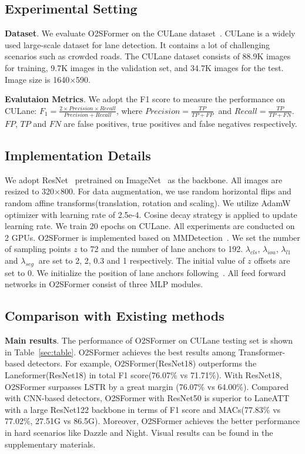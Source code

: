 \documentclass{bmvc2k}
\begin{document}
 \subsection{Experimental Setting}
 {\bf Dataset}. We evaluate O2SFormer on the CULane dataset~\cite{pan2018spatial}. CULane is a widely used large-scale dataset for lane detection. 
 It contains a lot of challenging scenarios such as crowded roads. The CULane dataset 
 consists of 88.9K images for training, 9.7K images in the validation set, and 34.7K images for the test. Image size is 1640×590. 
 
 {\bf Evalutaion Metrics}. We adopt the F1 score to measure the performance on CULane: $F_1=\frac{2\times P r e c i s i o n\times R e c a l l}{Precision+Recall}$, where $Precision=\frac{TP}{TP+FP}\ $ and $Recall=\frac{TP}{TP+FN}$. 
 $FP$, $TP$ and $FN$ are false positives, true positives and false negatives respectively.
 \vspace{-0.3cm}
 \subsection{Implementation Details}
 We adopt ResNet~\cite{he2016deep} pretrained on ImageNet~\cite{deng2009imagenet} as the backbone. 
 All images are resized to 320×800. For data augmentation, we use random horizontal 
 flips and random affine transforms(translation, rotation and scaling). We utilize 
 AdamW~\cite{loshchilov2017decoupled} optimizer with learning rate of 2.5e-4. Cosine decay strategy is applied to 
 update learning rate. We train 20 epochs on CULane. All experiments are conducted on 
 2 GPUs. O2SFormer is implemented based on MMDetection~\cite{mmdetection}. We 
 set the number of sampling points $z$ to 72 and the number of lane anchors to 192. 
 $\lambda_{cls}$, $\lambda_{iou}$, $\lambda_{l1}$ and $\lambda_{seg}\ $ are set to 2, 2, 0.3 and 1 respectively.
 The initial value of $z$ offsets are set to 0. We initialize the position of lane anchors following~\cite{zheng2022clrnet}.
 All feed forward networks in O2SFormer consist of three MLP modules.
 \vspace{-0.2cm}
 \subsection{Comparison with Existing methods}
 {\bf Main results}. The performance of O2SFormer on CULane testing set is shown in Table~\ref{sec:table}. O2SFormer 
  achieves the best results among Transformer-based detectors. For example, O2SFormer(ResNet18) 
  outperforms the Laneformer(ResNet18) in total F1 score(76.07\% vs 71.71\%). With ResNet18, O2SFormer surpasses LSTR by a great margin (76.07\% vs 64.00\%). Compared with CNN-based detectors, O2SFormer with ResNet50 is 
  superior to LaneATT with a large ResNet122 backbone in terms of F1 score and MACs(77.83\% vs 77.02\%, 27.51G vs 86.5G). 
  Moreover, O2SFormer achieves the better performance in hard scenarios like Dazzle and Night. Visual results can be found in the supplementary materials.
 
\end{document}
